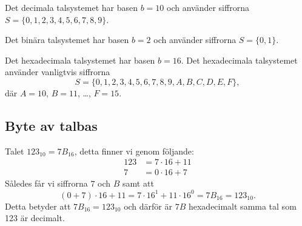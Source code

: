 \documentclass{beamer}
\theoremstyle{definition}
\theoremstyle{remark}
\begin{document}
\begin{frame}{\insertsubsectionhead}
  \begin{example}\label{ex:DecimalaTalsystemet}
    Det decimala talsystemet har basen \(b=10\) och använder siffrorna
    \(S=\{0,1,2,3,4,5,6,7,8,9\}\).
  \end{example}
  \begin{example}\label{ex:BinaraTalsystemet}
    Det binära talsystemet har basen \(b=2\) och använder siffrorna
    \(S=\{0,1\}\).
  \end{example}
  \begin{example}\label{ex:HexadecimalaTalsystemet}
    Det hexadecimala talsystemet har basen \(b=16\).
    Det hexadecimala talsystemet använder vanligtvis
    siffrorna \[S=\{0,1,2,3,4,5,6,7,8,9,A,B,C,D,E,F\},\] där \(A=10\),
    \(B=11\), \dots, \(F=15\).
  \end{example}
\end{frame}

\subsection{Byte av talbas}

\begin{frame}{\insertsubsectionhead}
  \begin{example}
    Talet \(123_{10} = 7B_{16}\), detta finner vi genom följande:
    \begin{align*}
      123 &= 7\cdot16 + 11 \\
      7 &= 0\cdot16 + 7
    \end{align*}
    Således får vi siffrorna \(7\) och \(B\) samt att
    \begin{equation*}
      (0+7)\cdot16 + 11 = 7\cdot16^1 + 11\cdot16^0 = 7B_{16} = 123_{10}.
    \end{equation*}
    Detta betyder att \(7B_{16} = 123_{10}\) och därför är \(7B\) hexadecimalt
    samma tal som 123 är decimalt.
  \end{example}
\end{frame}
\end{document}
